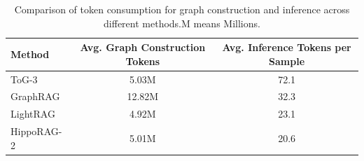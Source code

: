 \begin{table}[t]
\centering
\caption{Comparison of token consumption for graph construction and inference across different methods.M means Millions.}
\label{tab:token_consumption}
\begin{tabular}{lcc}
\toprule
\textbf{Method} & \textbf{Avg. Graph Construction Tokens} & \textbf{Avg. Inference Tokens per Sample} \\
\midrule
ToG-3 & 5.03M & 72.1 \\
GraphRAG & 12.82M & 32.3 \\
LightRAG & 4.92M & 23.1 \\
HippoRAG-2 & 5.01M & 20.6 \\
\bottomrule
\end{tabular}
\end{table}
